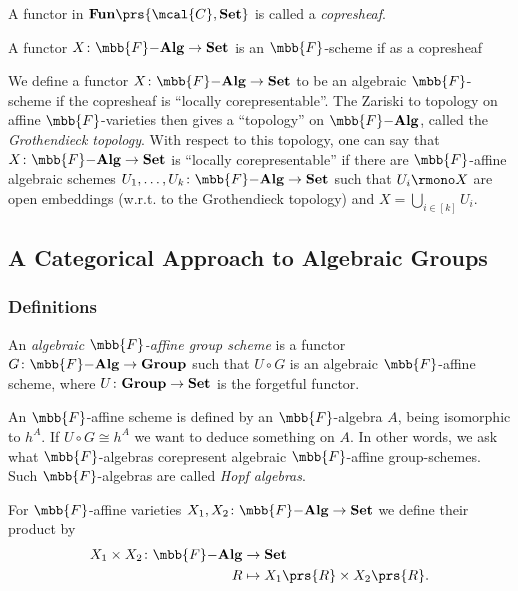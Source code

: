 \documentclass[10pt,a4paper,twoside,openany,hidelinks]{book}
\begin{document}
\begin{definition}[Copresheaf]
A functor in $\mbf{Fun}\prs{\mcal{C},\mbf{Set}}$ is called a \emph{copresheaf}.
\end{definition}

\begin{definition}
A functor $X \colon \mbb{F}\mbf{-Alg} \to \mbf{Set}$ is an $\mbb{F}$-scheme if as a copresheaf 
\end{definition}

We define a functor $X \colon \mbb{F}\mbf{-Alg} \to \mbf{Set}$ to be an algebraic $\mbb{F}$-scheme if the copresheaf is ``locally corepresentable''. The Zariski to topology on affine $\mbb{F}$-varieties then gives a ``topology'' on $\mbb{F}\mbf{-Alg}$, called the \emph{Grothendieck topology}.
With respect to this topology, one can say that $X \colon \mbb{F}\mbf{-Alg} \to \mbf{Set}$ is ``locally corepresentable'' if there are $\mbb{F}$-affine algebraic schemes $U_1, \ldots, U_k \colon \mbb{F}\mbf{-Alg} \to \mbf{Set}$ such that $U_i \rmono X$ are open embeddings (w.r.t. to the Grothendieck topology) and $X = \bigcup_{i \in [k]} U_i$.

\subsection{A Categorical Approach to Algebraic Groups}

\subsubsection{Definitions}

\begin{definition}
An \emph{algebraic $\mbb{F}$-affine group scheme} is a functor $G \colon \mbb{F}\mbf{-Alg} \to \mbf{Group}$ such that $U \circ G$ is an algebraic $\mbb{F}$-affine scheme, where $U \colon \mathbf{Group} \to \mathbf{Set}$ is the forgetful functor.
\end{definition}

\begin{remark}
An $\mbb{F}$-affine scheme is defined by an $\mbb{F}$-algebra $A$, being isomorphic to $h^A$. If $U \circ G \cong h^A$ we want to deduce something on $A$. In other words, we ask what $\mbb{F}$-algebras corepresent algebraic $\mbb{F}$-affine group-schemes. Such $\mbb{F}$-algebras are called \emph{Hopf algebras}.
\end{remark}

\begin{definition}
For $\mbb{F}$-affine varieties $X_1, X_2 \colon \mbb{F}\mbf{-Alg} \to \mbf{Set}$ we define their product by
\begin{align*}
X_1 \times X_2 \colon \mbb{F}\mbf{-Alg} &\to \mbf{Set} \\
R &\mapsto X_1\prs{R} \times X_2\prs{R} \text{.}
\end{align*}
\end{definition}
\end{document}
